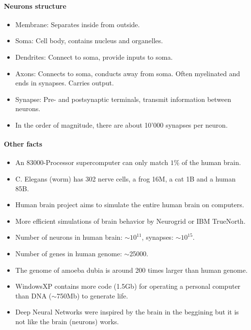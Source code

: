 \documentclass[main]{subfiles}
\begin{document}
\paragraph{Neurons structure}
\begin{itemize}[noitemsep,nolistsep]
	\item Membrane: Separates inside from outside.
	\item Soma: Cell body, contains nucleus and organelles.
	\item Dendrites: Connect to soma, provide inputs to soma.
	\item Axons: Connects to soma, conducts away from soma. Often myelinated and ends in synapses. Carries output.
	\item Synapse: Pre- and postsynaptic terminals, transmit information between neurons.
	\item In the order of magnitude, there are about 10'000 synapses per neuron.
\end{itemize}

\paragraph{Other facts}
\begin{itemize}[noitemsep,nolistsep]
	\item An 83000-Processor supercomputer can only match $1\%$ of the human brain.
	\item C. Elegans (worm) has 302 nerve cells, a frog 16M, a cat 1B and a human 85B.
	\item Human brain project aims to simulate the entire human brain on computers.
	\item More efficient simulations of brain behavior by Neurogrid or IBM TrueNorth.
	\item Number of neurons in human brain: $\sim10^{11}$, synapses: $\sim10^{15}$.
	\item Number of genes in human genome: $\sim$25000.
	\item The genome of amoeba dubia is around 200 times larger than human genome.
	\item WindowsXP contains more code (1.5Gb) for operating a personal computer than DNA ($\sim$750Mb) to generate life.
	\item Deep Neural Networks were inspired by the brain in the beggining but it is not like the brain (neurons) works.
	
\end{itemize}
\end{document}
